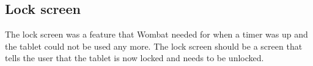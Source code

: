 \subsection{Lock screen}
\label{backlog:lock_screen}
The lock screen was a feature that Wombat needed for when a timer was up and the tablet could not be used any more. The lock screen should be a screen that tells the user that the tablet is now locked and needs to be unlocked.